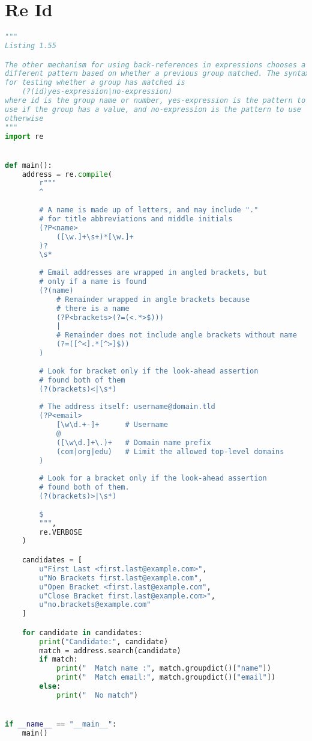 \documentclass[a4paper,landscape]{report}
\begin{document}
\section{Re Id}
\begin{lstlisting}[language=Python]
"""
Listing 1.55

The other mechanism for using back-references in expressions chooses a
different pattern based on whether a previous group matched. The syntax
for testing whether a group has matched is
    (?(id)yes-expression|no-expression)
where id is the group name or number, yes-expression is the pattern to
use if the group has a value, and no-expression is the pattern to use
otherwise
"""
import re


def main():
    address = re.compile(
        r"""
        ^
        
        # A name is made up of letters, and may include "."
        # for title abbreviations and middle initials
        (?P<name>
            ([\w.]+\s+)*[\w.]+
        )?
        \s*
        
        # Email addresses are wrapped in angled brackets, but
        # only if a name is found
        (?(name)
            # Remainder wrapped in angle brackets because
            # there is a name
            (?P<brackets>(?=(<.*>$)))
            |
            # Remainder does not include angle brackets without name
            (?=([^<].*[^>]$))
        )
        
        # Look for bracket only if the look-ahead assertion
        # found both of them
        (?(brackets)<|\s*)
        
        # The address itself: username@domain.tld
        (?P<email>
            [\w\d.+-]+      # Username
            @
            ([\w\d.]+\.)+   # Domain name prefix
            (com|org|edu)   # Limit the allowed top-level domains
        )
        
        # Look for a bracket only if the look-ahead assertion
        # found both of them.
        (?(brackets)>|\s*)
        
        $
        """,
        re.VERBOSE
    )

    candidates = [
        u"First Last <first.last@example.com>",
        u"No Brackets first.last@example.com",
        u"Open Bracket <first.last@example.com",
        u"Close Bracket first.last@example.com>",
        u"no.brackets@example.com"
    ]

    for candidate in candidates:
        print("Candidate:", candidate)
        match = address.search(candidate)
        if match:
            print("  Match name :", match.groupdict()["name"])
            print("  Match email:", match.groupdict()["email"])
        else:
            print("  No match")


if __name__ == "__main__":
    main()

\end{lstlisting}
\end{document}
